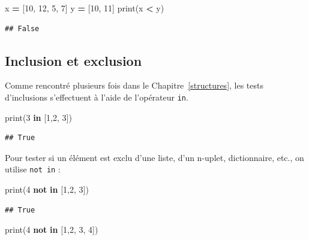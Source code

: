 \documentclass[
  12pt,
]{book}
\newenvironment{Shaded}{\begin{snugshade}}{\end{snugshade}}
\newcommand{\BuiltInTok}[1]{#1}
\newcommand{\DecValTok}[1]{\textcolor[rgb]{0.00,0.00,0.81}{#1}}
\newcommand{\KeywordTok}[1]{\textcolor[rgb]{0.13,0.29,0.53}{\textbf{#1}}}
\newcommand{\NormalTok}[1]{#1}
\newcommand{\OperatorTok}[1]{\textcolor[rgb]{0.81,0.36,0.00}{\textbf{#1}}}
\numberwithin{equation}{section}
\numberwithin{countremarque}{section}
\begin{document}
\begin{Shaded}
\begin{Highlighting}[]
\NormalTok{x }\OperatorTok{=}\NormalTok{ [}\DecValTok{10}\NormalTok{, }\DecValTok{12}\NormalTok{, }\DecValTok{5}\NormalTok{, }\DecValTok{7}\NormalTok{]}
\NormalTok{y }\OperatorTok{=}\NormalTok{ [}\DecValTok{10}\NormalTok{, }\DecValTok{11}\NormalTok{]}
\BuiltInTok{print}\NormalTok{(x }\OperatorTok{\textless{}}\NormalTok{ y)}
\end{Highlighting}
\end{Shaded}

\begin{lstlisting}
## False
\end{lstlisting}

\subsection{Inclusion et exclusion}\label{inclusion-et-exclusion}

Comme rencontré plusieurs fois dans le Chapitre~\ref{structures}, les tests d'inclusions s'effectuent à l'aide de l'opérateur \texttt{in}.

\begin{Shaded}
\begin{Highlighting}[]
\BuiltInTok{print}\NormalTok{(}\DecValTok{3} \KeywordTok{in}\NormalTok{ [}\DecValTok{1}\NormalTok{,}\DecValTok{2}\NormalTok{, }\DecValTok{3}\NormalTok{])}
\end{Highlighting}
\end{Shaded}

\begin{lstlisting}
## True
\end{lstlisting}

Pour tester si un élément est exclu d'une liste, d'un n-uplet, dictionnaire, etc., on utilise \texttt{not\ in} :

\begin{Shaded}
\begin{Highlighting}[]
\BuiltInTok{print}\NormalTok{(}\DecValTok{4} \KeywordTok{not} \KeywordTok{in}\NormalTok{ [}\DecValTok{1}\NormalTok{,}\DecValTok{2}\NormalTok{, }\DecValTok{3}\NormalTok{])}
\end{Highlighting}
\end{Shaded}

\begin{lstlisting}
## True
\end{lstlisting}

\begin{Shaded}
\begin{Highlighting}[]
\BuiltInTok{print}\NormalTok{(}\DecValTok{4} \KeywordTok{not} \KeywordTok{in}\NormalTok{ [}\DecValTok{1}\NormalTok{,}\DecValTok{2}\NormalTok{, }\DecValTok{3}\NormalTok{, }\DecValTok{4}\NormalTok{])}
\end{Highlighting}
\end{Shaded}
\end{document}
